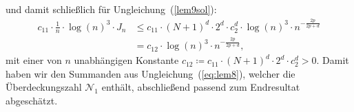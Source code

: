 und damit schließlich für Ungleichung~(\ref{lem9sol}):
\begin{equation}
\begin{split}
c_{11} \cdot \frac{1}{n} \cdot \log(n)^3 \cdot J_n
& \leq c_{11} \cdot (N+1)^d \cdot 2^d \cdot c_2^d \cdot \log(n)^3 \cdot n^{-\frac{2p}{2p + d}} \\
& = c_{12} \cdot \log(n)^3 \cdot n^{-\frac{2p}{2p + d}},
\end{split}
\end{equation}
mit einer von $n$ unabhängigen Konstante $c_{12} \coloneqq c_{11} \cdot (N + 1)^d \cdot 2^d \cdot c_2^d > 0.$
Damit haben wir den Summanden aus Ungleichung~(\ref{eq:lem8}), welcher die Überdeckungszahl $\mathcal{N}_1$ enthält, abschließend passend zum Endresultat abgeschätzt.

